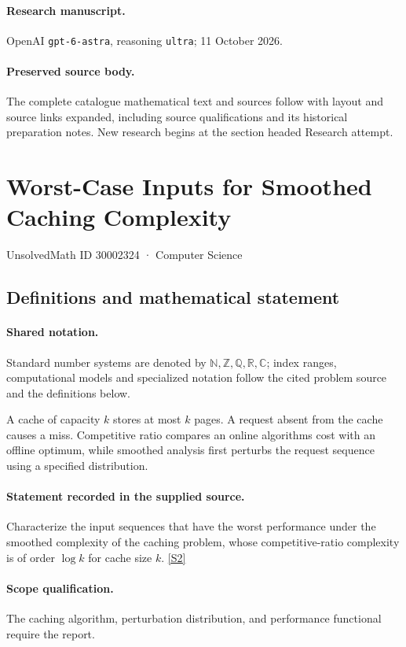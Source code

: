 \documentclass[11pt]{article}
\begin{document}
\paragraph{Research manuscript.} OpenAI \texttt{gpt-6-astra}, reasoning \texttt{ultra}; 11 October 2026.
\paragraph{Preserved source body.} The complete catalogue mathematical text and sources follow with layout and source links expanded, including source qualifications and its historical preparation notes. New research begins at the section headed Research attempt.

\section{Worst-Case Inputs for Smoothed Caching Complexity}\label{30002324}
{\small UnsolvedMath ID 30002324 · Computer Science}
\subsection{Definitions and mathematical statement}

\paragraph{Shared notation.}Standard number systems are denoted by $\mathbb N,\mathbb Z,\mathbb Q,\mathbb R,\mathbb C$; index ranges, computational models and specialized notation follow the cited problem source and the definitions below.


A cache of capacity $k$ stores at most $k$ pages. A request absent from the cache causes a miss. Competitive ratio compares an online algorithm\textquotesingle s cost with an offline optimum, while smoothed analysis first perturbs the request sequence using a specified distribution.
\paragraph{Statement recorded in the supplied source.}
Characterize the input sequences that have the worst performance under the smoothed complexity of the caching problem, whose competitive-ratio complexity is of order $\log k$ for cache size $k$. \href{https://doi.org/10.4171/owr/2013/18}{[S2]}
\paragraph{Scope qualification.}
The caching algorithm, perturbation distribution, and performance functional require the report.
\end{document}

